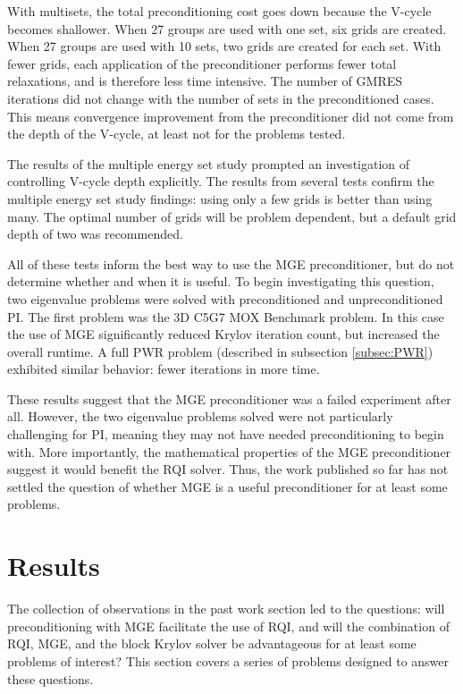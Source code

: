 \documentclass{article}                                                                           %
\begin{document}
With multisets, the total preconditioning cost goes down because the V-cycle becomes shallower. When 27 groups are used with one set, six grids are created. When 27 groups are used with 10 sets, two grids are created for each set. With fewer grids, each application of the preconditioner performs fewer total relaxations, and is therefore less time intensive. The number of GMRES iterations did not change with the number of sets in the preconditioned cases. This means convergence improvement from the preconditioner did not come from the depth of the V-cycle, at least not for the problems tested.

The results of the multiple energy set study prompted an investigation of controlling V-cycle depth explicitly. The results from several tests confirm the multiple energy set study findings: using only a few grids is better than using many. The optimal number of grids will be problem dependent, but a default grid depth of two was recommended.

All of these tests inform the best way to use the MGE preconditioner, but do not determine whether and when it is useful. To begin investigating this question, two eigenvalue problems were solved with preconditioned and unpreconditioned PI. The first problem was the 3D C5G7 MOX Benchmark problem. In this case the use of MGE significantly reduced Krylov iteration count, but increased the overall runtime. A full PWR problem (described in subsection \ref{subsec:PWR}) exhibited similar behavior: fewer iterations in more time. 

These results suggest that the MGE preconditioner was a failed experiment after all. However, the two eigenvalue problems solved were not particularly challenging for PI, meaning they may not have needed preconditioning to begin with. More importantly, the mathematical properties of the MGE preconditioner suggest it would benefit the RQI solver. Thus, the work published so far has not settled the question of whether MGE is a useful preconditioner for at least some problems. 

\section{Results}
\label{sec:results}
The collection of observations in the past work section led to the questions: will preconditioning with MGE facilitate the use of RQI, and will the combination of RQI, MGE, and the block Krylov solver be advantageous for at least some problems of interest? This section covers a series of problems designed to answer these questions.
\end{document}
